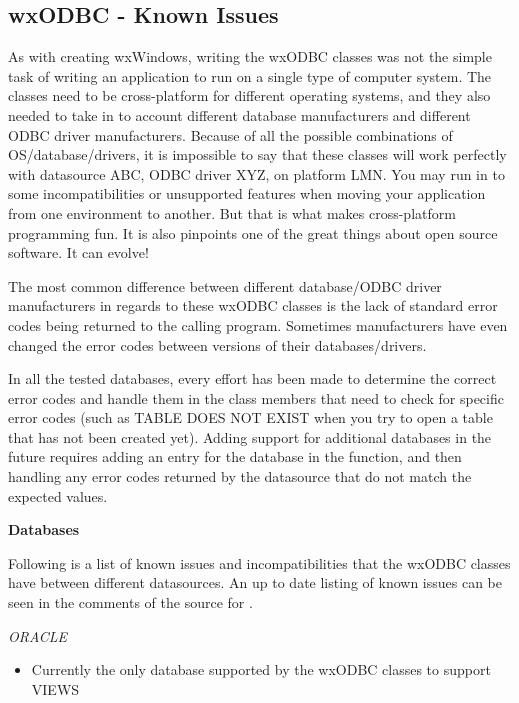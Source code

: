 

\subsection{wxODBC - Known Issues}\label{wxodbcknownissues}

As with creating wxWindows, writing the wxODBC classes was not the simple 
task of writing an application to run on a single type of computer system.  
The classes need to be cross-platform for different operating systems, and 
they also needed to take in to account different database manufacturers and 
different ODBC driver manufacturers.  Because of all the possible combinations 
of OS/database/drivers, it is impossible to say that these classes will work 
perfectly with datasource ABC, ODBC driver XYZ, on platform LMN.  You may run 
in to some incompatibilities or unsupported features when moving your 
application from one environment to another.  But that is what makes 
cross-platform programming fun.  It is also pinpoints one of the great 
things about open source software.  It can evolve!

The most common difference between different database/ODBC driver 
manufacturers in regards to these wxODBC classes is the lack of 
standard error codes being returned to the calling program.  Sometimes 
manufacturers have even changed the error codes between versions of 
their databases/drivers.  

In all the tested databases, every effort has been made to determine 
the correct error codes and handle them in the class members that need 
to check for specific error codes (such as TABLE DOES NOT EXIST when 
you try to open a table that has not been created yet).  Adding support 
for additional databases in the future requires adding an entry for the 
database in the  function, and then handling any error codes 
returned by the datasource that do not match the expected values.


{\bf Databases}

Following is a list of known issues and incompatibilities that the 
wxODBC classes have between different datasources.  An up to date 
listing of known issues can be seen in the comments of the source 
for .

{\it ORACLE}
\begin{itemize}\itemsep=0pt
\item Currently the only database supported by the wxODBC classes to support VIEWS
\end{itemize}

